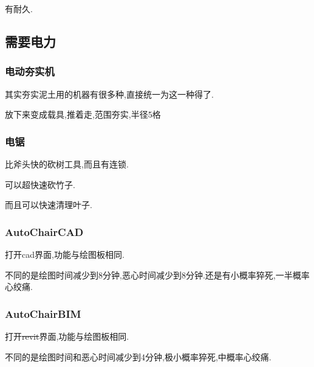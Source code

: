 {{{      有耐久.
    }
  }

  \subsection{需要电力}{

    \subsubsection{电动夯实机}{
      其实夯实泥土用的机器有很多种,直接统一为这一种得了.

      放下来变成载具,推着走,范围夯实,半径5格
    }

    \subsubsection{电锯}{
      比斧头快的砍树工具,而且有连锁.

      可以超快速砍竹子.

      而且可以快速清理叶子.
    }

    \subsubsection{AutoChairCAD}{
      打开cad界面,功能与绘图板相同.

      不同的是绘图时间减少到8分钟,恶心时间减少到8分钟.还是有小概率猝死,一半概率心绞痛.
    }

    \subsubsection{AutoChairBIM}{
      打开\sout{revit}界面,功能与绘图板相同.

      不同的是绘图时间和恶心时间减少到4分钟,极小概率猝死,中概率心绞痛.
    }

  }

 }